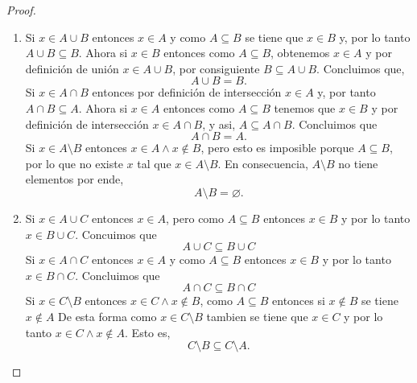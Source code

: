 \documentclass[12pt,a4paper]{book}
\begin{document}
\begin{proof}
\begin{enumerate}
\begin{equation*}
                \varnothing\setminus A=\varnothing.
            \end{equation*}
            \item[(b)] Si $x\in A\cup B$ entonces $x\in A$ y como $A\subseteq B$ se tiene que $x\in B$ y, por lo tanto
            $A\cup B\subseteq B$. Ahora si $x\in B$ entonces como $A\subseteq B$, obtenemos $x\in A$ y por definición de unión
            $x\in A\cup B$, por consiguiente $B\subseteq A\cup B$. Concluimos que,
            \begin{equation*}
                A\cup B=B.
            \end{equation*}
            Si $x\in A\cap B$ entonces por definición de intersección $x\in A$ y, por tanto $A\cap B\subseteq A$. Ahora si $x\in A$ entonces como $A\subseteq B$
            tenemos que $x\in B$ y por definición de intersección $x\in A\cap B$, y asi, $A\subseteq A\cap B$.
            Concluimos que
            \begin{equation*}
                A\cap B=A.
            \end{equation*}
            Si $x\in A\setminus B$ entonces $x\in A\wedge x\notin B$, pero esto es imposible porque $A\subseteq B$, por lo que no existe $x$
            tal que $x\in A\setminus B$. En consecuencia, $A\setminus B$ no tiene elementos por ende,
            \begin{equation*}
                A\setminus B=\varnothing.
            \end{equation*}
            \item[(c)] Si $x\in A\cup C$ entonces $x\in A$, pero como $A\subseteq B$ entonces $x\in B$ y por lo tanto
            $x\in B\cup C$. Concuimos que
            \begin{equation*}
                A\cup C\subseteq B\cup C
            \end{equation*}
            Si $x\in A\cap C$ entonces $x\in A$ y como $A\subseteq B$ entonces $x\in B$ y por lo tanto $x\in B\cap C$. Concluimos que
            \begin{equation*}
                A\cap C\subseteq B\cap C
            \end{equation*}
            Si $x\in C\setminus B$ entonces $x\in C\wedge x\notin B$, como $A\subseteq B$ entonces si $x\notin B$ se tiene $x\notin A$
            De esta forma como $x\in C\setminus B$ tambien se tiene que $x\in C$ y por lo tanto $x\in C\wedge x\notin A$. Esto es,
            \begin{equation*}
                C\setminus B\subseteq C\setminus A.
            \end{equation*}
        \end{enumerate}
    \end{proof}
\end{document}
